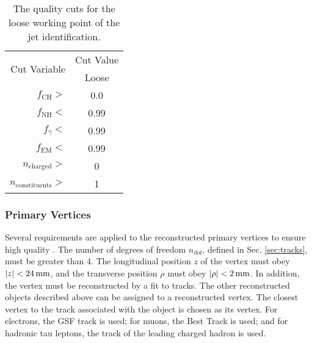 \begin{table}[htb]
  \begin{center}
    \begin{tabular}{|r|c|}
      \hline
      \multirow{2}{*}{Cut Variable} & Cut Value \\
      \cline{2-2}
                                    & Loose \\
      \hline
      $f_{\text{CH}}>$              & 0.0 \\
      $f_{\text{NH}}<$              & 0.99 \\
      $f_{\gamma}<$                 & 0.99 \\
      $f_{\text{EM}}<$              & 0.99 \\
      $n_{\text{charged}}>$         & 0 \\
      $n_{\text{constituents}}>$    & 1 \\
      \hline
    \end{tabular}
    \caption{The quality cuts for the loose working point of the jet identification. }
    \label{tab:jetWP}
  \end{center}
\end{table}

\subsubsection{Primary Vertices
\label{sec:vtx-obj}}

Several requirements are applied to the reconstructed primary vertices to ensure high quality \cite{CMS-PAS-TRK-10-005}. The number of degrees of freedom $n_{\text{dof}}$, defined in Sec. \ref{sec:tracks}, must be greater than 4. The longitudinal position $z$ of the vertex must obey $|z|<24\,\text{mm}$, and the transverse position $\rho$ must obey $|\rho|<2\,\text{mm}$. In addition, the vertex must be reconstructed by a fit to tracks. The other reconstructed objects described above can be assigned to a reconstructed vertex. The closest vertex to the track associated with the object is chosen as its vertex. For electrons, the GSF track is used; for muons, the Best Track is used; and for hadronic tau leptons, the track of the leading charged hadron is used.